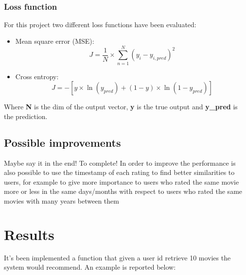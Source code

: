 \documentclass{article}
\begin{document}
\subsubsection{Loss function}
For this project two different loss functions have been evaluated: 
\begin{itemize}
    \item Mean square error (MSE):
    \begin{equation}\nonumber
        J = \frac{1}{N} \times \sum_{n=1}^{N} (y_i - y_{i,pred})^2
    \end{equation}
    
    \item Cross entropy:
    \begin{equation}\nonumber
        J = -[y \times \ln(y_{pred}) + (1 - y) \times \ln(1 - y_{pred})]
    \end{equation}
\end{itemize}

Where \textbf{N} is the dim of the output vector, \textbf{y} is the true output and \textbf{y_{pred}} is  the  prediction.




\subsection{Possible improvements}
Maybe say it in the end! To complete!
In order to improve the performance is also possible to use the timestamp of each rating to find better similarities to users, for example to give more importance to users who rated the same movie more or less in the same days/months with respect to users who rated the same movies with many years between them



\newpage

\section{Results}
It's been implemented a function that given a user id retrieve 10 movies the system would recommend. An example is reported below:
\end{document}
